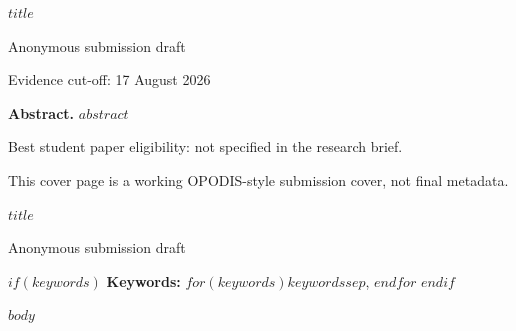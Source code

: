 \documentclass[10pt,a4paper]{article}
\begin{document}
\begin{titlepage}
\centering
\vspace*{22mm}
{\LARGE\bfseries $title$\par}
\vspace{14mm}
{\large Anonymous submission draft\par}
\vspace{8mm}
{\small Evidence cut-off: 17 August 2026\par}
\vfill
\begin{minipage}{0.88\textwidth}
\textbf{Abstract.}
$abstract$
\end{minipage}
\vfill
{\small Best student paper eligibility: not specified in the research brief.\par}
{\small This cover page is a working OPODIS-style submission cover, not final metadata.\par}
\end{titlepage}

\begin{center}
{\LARGE\bfseries $title$\par}
\vspace{1.0em}
{\large Anonymous submission draft\par}
\end{center}

\begin{abstract}
$abstract$
\end{abstract}

$if(keywords)$
\noindent\textbf{Keywords:} $for(keywords)$$keywords$$sep$, $endfor$
\vspace{0.6em}
$endif$

$body$
\end{document}
